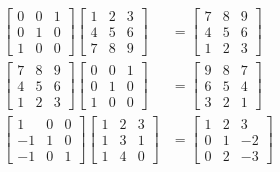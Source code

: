 \documentclass[main.tex]{subfiles}
\begin{document}
\begin{enumerate}
            $$
            \begin{aligned}
            \left[\begin{array}{lll}
            0 & 0 & 1 \\
            0 & 1 & 0 \\
            1 & 0 & 0
            \end{array}\right]\left[\begin{array}{lll}
            1 & 2 & 3 \\
            4 & 5 & 6 \\
            7 & 8 & 9
            \end{array}\right] & = \left[\begin{array}{lll}
            7 & 8 & 9 \\
            4 & 5 & 6 \\
            1 & 2 & 3
            \end{array}\right] \\
            \left[\begin{array}{lll}
            7 & 8 & 9 \\
            4 & 5 & 6 \\
            1 & 2 & 3
            \end{array}\right]\left[\begin{array}{lll}
            0 & 0 & 1 \\
            0 & 1 & 0 \\
            1 & 0 & 0
            \end{array}\right] & = \left[\begin{array}{lll}
            9 & 8 & 7 \\
            6 & 5 & 4 \\
            3 & 2 & 1
            \end{array}\right] \\
            \left[\begin{array}{ccc}
            1 & 0 & 0 \\
            -1 & 1 & 0 \\
            -1 & 0 & 1
            \end{array}\right]\left[\begin{array}{lll}
            1 & 2 & 3 \\
            1 & 3 & 1 \\
            1 & 4 & 0
            \end{array}\right] & =\left[\begin{array}{ccc}
            1 & 2 & 3 \\
            0 & 1 & -2 \\
            0 & 2 & -3
            \end{array}\right]
            \end{aligned}
            $$
        

\end{enumerate}
\end{document}
